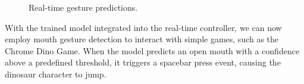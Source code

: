 \documentclass{report}
\begin{document}
\begin{figure}[H]
    \caption{Real-time gesture predictions.}
    \label{fig:mouth_predictions_grid}
\end{figure}

With the trained model integrated into the real-time controller, we can now employ mouth gesture detection to interact with simple games, such as the Chrome Dino Game. When the model predicts an open mouth with a confidence above a predefined threshold, it triggers a spacebar press event, causing the dinosaur character to jump.
\end{document}

